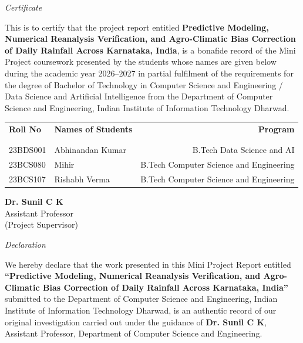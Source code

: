 \documentclass[12pt]{article}
\begin{document}
\begin{center}
	\emph{\huge{Certificate}}\\[2.5cm]
\end{center}
\normalsize This is to certify that the project report entitled \textbf{Predictive Modeling, Numerical Reanalysis Verification, and Agro-Climatic Bias Correction of Daily Rainfall Across Karnataka, India}, is a bonafide record of the Mini Project coursework presented by the students whose names are given below during the academic year 2026--2027 in partial fulfilment of the requirements for the degree of Bachelor of Technology in Computer Science and Engineering / Data Science and Artificial Intelligence from the Department of Computer Science and Engineering, Indian Institute of Information Technology Dharwad.\\[1.0cm]

\begin{table}[h]
	\centering
	\begin{tabular}{llr}
		\textbf{Roll No} & \textbf{Names of Students} & \textbf{Program} \\ \\ \hline
		\\
		23BDS001 & Abhinandan Kumar & B.Tech Data Science and AI \\ 
		23BCS080 & Mihir & B.Tech Computer Science and Engineering \\ 
		23BCS107 & Rishabh Verma & B.Tech Computer Science and Engineering \\ 
	\end{tabular}
\end{table}

\vfill

\begin{flushright}
	\textbf{Dr. Sunil C K}\\
	Assistant Professor\\
	(Project Supervisor)\\[1.5cm]
\end{flushright}

\newpage
\thispagestyle{empty}

\begin{center}
	\emph{\huge{Declaration}}\\[2.0cm]
\end{center}

\noindent We hereby declare that the work presented in this Mini Project Report entitled \textbf{``Predictive Modeling, Numerical Reanalysis Verification, and Agro-Climatic Bias Correction of Daily Rainfall Across Karnataka, India''} submitted to the Department of Computer Science and Engineering, Indian Institute of Information Technology Dharwad, is an authentic record of our original investigation carried out under the guidance of \textbf{Dr. Sunil C K}, Assistant Professor, Department of Computer Science and Engineering.
\end{document}
